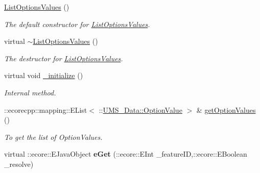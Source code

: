 \begin{DoxyCompactItemize}
\item 
\hypertarget{classUMS__Data_1_1ListOptionsValues_a4aa7f57d57475f7df4ac13f0d6629f5a}{
\hyperlink{classUMS__Data_1_1ListOptionsValues_a4aa7f57d57475f7df4ac13f0d6629f5a}{ListOptionsValues} ()}
\label{classUMS__Data_1_1ListOptionsValues_a4aa7f57d57475f7df4ac13f0d6629f5a}

\begin{DoxyCompactList}\small\item\em The default constructor for \hyperlink{classUMS__Data_1_1ListOptionsValues}{ListOptionsValues}. \item\end{DoxyCompactList}\item 
\hypertarget{classUMS__Data_1_1ListOptionsValues_a1e31cfe680ff846593ef3738bcc52dfb}{
virtual \hyperlink{classUMS__Data_1_1ListOptionsValues_a1e31cfe680ff846593ef3738bcc52dfb}{$\sim$ListOptionsValues} ()}
\label{classUMS__Data_1_1ListOptionsValues_a1e31cfe680ff846593ef3738bcc52dfb}

\begin{DoxyCompactList}\small\item\em The destructor for \hyperlink{classUMS__Data_1_1ListOptionsValues}{ListOptionsValues}. \item\end{DoxyCompactList}\item 
\hypertarget{classUMS__Data_1_1ListOptionsValues_aa544551a4ea7f1bfcfa663423b88359f}{
virtual void \hyperlink{classUMS__Data_1_1ListOptionsValues_aa544551a4ea7f1bfcfa663423b88359f}{\_\-initialize} ()}
\label{classUMS__Data_1_1ListOptionsValues_aa544551a4ea7f1bfcfa663423b88359f}

\begin{DoxyCompactList}\small\item\em Internal method. \item\end{DoxyCompactList}\item 
::ecorecpp::mapping::EList$<$ ::\hyperlink{classUMS__Data_1_1OptionValue}{UMS\_\-Data::OptionValue} $>$ \& \hyperlink{classUMS__Data_1_1ListOptionsValues_a52de58e4ed4c12561c240a2ab5235e74}{getOptionValues} ()
\begin{DoxyCompactList}\small\item\em To get the list of OptionValues. \item\end{DoxyCompactList}\item 
\hypertarget{classUMS__Data_1_1ListOptionsValues_ab6559ccb1538291ce958f20144726242}{
virtual ::ecore::EJavaObject {\bfseries eGet} (::ecore::EInt \_\-featureID,::ecore::EBoolean \_\-resolve)}
\label{classUMS__Data_1_1ListOptionsValues_ab6559ccb1538291ce958f20144726242}


\end{DoxyCompactItemize}
